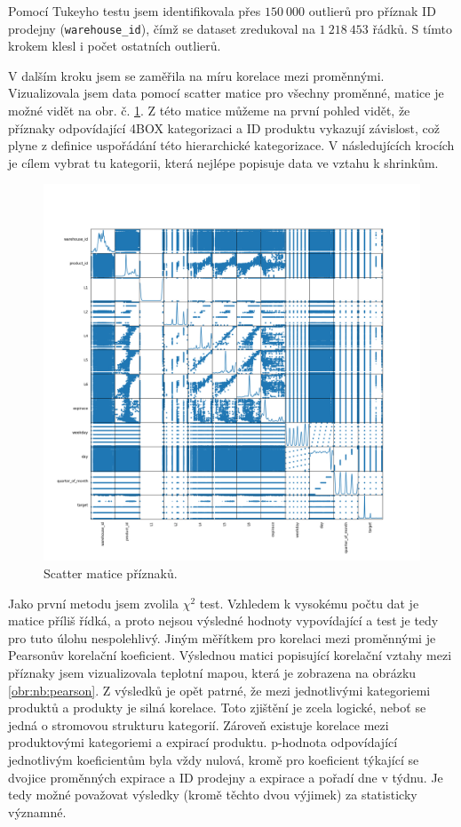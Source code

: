 Pomocí Tukeyho testu jsem identifikovala přes $150\ 000$ outlierů pro příznak ID prodejny (\texttt{warehouse\_id}), čímž se dataset zredukoval na $1\ 218\ 453$ řádků. S tímto krokem klesl i počet ostatních outlierů.

V dalším kroku jsem se zaměřila na míru korelace mezi proměnnými. Vizualizovala jsem data pomocí scatter matice pro všechny proměnné, matice je možné vidět na obr. č. \ref*{obr:nb:scatter}. Z této matice můžeme na první pohled vidět, že příznaky odpovídající 4BOX kategorizaci a ID produktu vykazují závislost, což plyne z definice uspořádání této hierarchické kategorizace. V následujících krocích je cílem vybrat tu kategorii, která nejlépe popisuje data ve vztahu k shrinkům.

\begin{figure}[h!]
    \centering
    \includegraphics[width=.8\textwidth]{obrazky/zntb/MyScatter.png}
    \caption{Scatter matice příznaků.}
    \label{obr:nb:scatter}
\end{figure}
 
Jako první metodu jsem zvolila $\chi^2$ test. Vzhledem k vysokému počtu dat je matice příliš řídká, a proto nejsou výsledné hodnoty vypovídající a test je tedy pro tuto úlohu nespolehlivý.
Jiným měřítkem pro korelaci mezi proměnnými je Pearsonův korelační koeficient. %
Výslednou matici popisující korelační vztahy mezi příznaky jsem vizualizovala teplotní mapou, která je zobrazena na obrázku \ref*{obr:nb:pearson}. Z výsledků je opět patrné, že mezi jednotlivými kategoriemi produktů a produkty je silná korelace. Toto zjištění je zcela logické, neboť se jedná o stromovou strukturu kategorií. Zároveň existuje korelace mezi produktovými kategoriemi a expirací produktu. p-hodnota odpovídající jednotlivým koeficientům byla vždy nulová, kromě pro koeficient týkající se dvojice proměnných expirace a ID prodejny a expirace a pořadí dne v týdnu. Je tedy možné považovat výsledky (kromě těchto dvou výjimek) za statisticky významné.

